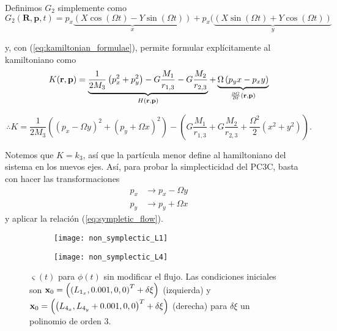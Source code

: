Definimos $G_2$ simplemente como
\begin{equation}
 G_2(\mathbf{R}, \mathbf{p}, t) = p_x \underbrace{\left( X \cos (\Omega t) - Y \sin (\Omega t) \right) }_{x} + p_x (\underbrace{ \left( X \sin (\Omega t) + Y \cos (\Omega t) \right)}_{y}
 \label{eq:generating_function}
\end{equation}

y, con (\ref{eq:kamiltonian_formulae}), permite formular explícitamente al kamiltoniano como
\begin{equation*}
 K(\mathbf{r}, \mathbf{p}) = \underbrace{ \frac{1}{2M_3}\left( p_x^2 + p_y^2 \right) - G \frac{M_1}{r_{1,3}} - G \frac{M_2}{r_{2,3}}}_{H(\mathbf{r}, \mathbf{p}) } + \underbrace{\Omega\left( p_y x - p_x y \right) }_{\frac{\partial G}{\partial t}(\mathbf{r}, \mathbf{p})}
\end{equation*}

\begin{equation}
 \therefore K = \frac{1}{2M_3} \left( (p_x - \Omega y)^2 + (p_y + \Omega x)^2 \right) - \left(G \frac{M_1}{r_{1,3}} + G \frac{M_2}{r_{2,3}} + \frac{\Omega^2}{2}\left( x^2 + y^2 \right) \right).
 \label{eq:kamiltonian}
\end{equation}

Notemos que $K = k_3$, así que la partícula menor define al hamiltoniano del sistema en los nuevos ejes. Así, para probar la simplecticidad del PC3C, basta con hacer las transformaciones 
\begin{align}
p_x &\to p_x - \Omega y \\
p_y &\to p_y + \Omega x
\label{eq:momentum_transformation}
\end{align} 
y aplicar la relación (\ref{eq:sympletic_flow}).

\begin{figure}[h!]
\centering
\begin{subfigure}{0.49\textwidth}
	\centering
	\texttt{[image: non\_symplectic\_L1]}
\end{subfigure}
%
\begin{subfigure}{0.49\textwidth}
	\centering
	\texttt{[image: non\_symplectic\_L4]}
\end{subfigure}
\caption{ $\varsigma(t)$ para $\phi(t)$ sin modificar el flujo. Las condiciones iniciales son $\mathbf{x}_0 = \left( \left( L_{1_x}, 0.001, 0, 0 \right)^T + \delta \xi \right) $ (izquierda) y $ \mathbf{x}_0 = \left( \left( L_{4_x}, L_{4_y} + 0.001, 0, 0 \right)^T + \delta \xi \right) $ (derecha) para $\delta \xi$ un polinomio de orden $3$.}
\label{fig:non_symplectic_L4_L1}
\end{figure}

